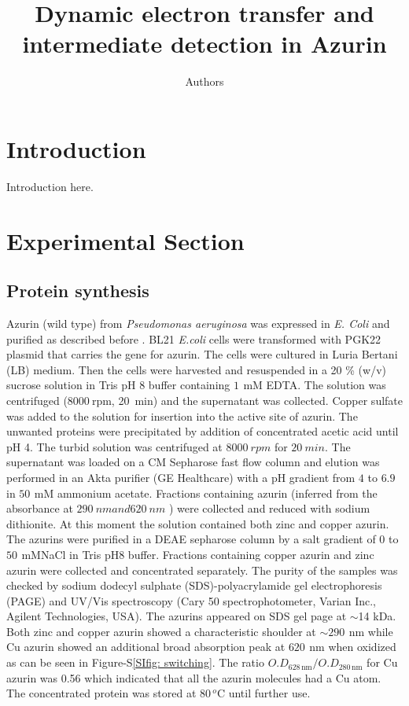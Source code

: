 \documentclass[journal=jacsat,manuscript=article]{achemso}
\author{Authors}
\affiliation{Huygens-Kamerlingh Onnes Laboratory, Leiden University, RA, Leiden, The Netherlands}
\title[]
{Dynamic electron transfer and intermediate detection in Azurin}
\newcommand{\nm}{\ensuremath{\,\textrm{nm}}}
\newcommand{\mM}{\ensuremath{\,\textrm{mM}}}
\newcommand{\degree}{\ensuremath{\,^o\textrm{C}}}
\begin{document}
\section{Introduction}
Introduction here.
\section{Experimental Section}
\subsection{Protein synthesis}
Azurin (wild type) from \textit{Pseudomonas aeruginosa} was expressed in \textit{E. Coli} and purified as described before \citep{kamp1990purification}. BL21 \textit{E.coli} cells were transformed with PGK22 plasmid that carries the gene for azurin. The cells were cultured in Luria Bertani (LB) medium. Then the cells were harvested and resuspended in a 20 \% (w/v) sucrose solution in Tris pH 8 buffer containing $1~\mM$ EDTA. The solution was centrifuged ($8000~$rpm, 20~min) and the supernatant was collected. Copper sulfate was added to the solution for insertion into the active site of azurin. The unwanted proteins were precipitated by addition of concentrated acetic acid until pH 4. The turbid solution was centrifuged at $8000~rpm$ for $20~min$. The supernatant was loaded on a CM Sepharose fast flow column and elution was performed in an Akta purifier (GE Healthcare) with a pH gradient from $4$ to $6.9$ in $50~\mM$ ammonium acetate. Fractions containing azurin (inferred from the absorbance at $290~nm and 620~nm$ ) were collected and reduced with sodium dithionite. At this moment the solution contained both zinc and copper azurin. The azurins were purified in a DEAE sepharose column by a salt gradient of 0 to $50~$\mM NaCl in Tris pH8 buffer. Fractions containing copper azurin and zinc azurin were collected and concentrated separately. The purity of the samples was checked by sodium dodecyl sulphate (SDS)-polyacrylamide gel electrophoresis (PAGE) and UV/Vis spectroscopy (Cary 50 spectrophotometer, Varian Inc., Agilent Technologies, USA). The azurins appeared on SDS gel page at $\sim$14 kDa. Both zinc and copper azurin showed a characteristic shoulder at ${\sim}290~\nm$ while Cu azurin showed an additional broad absorption peak at $620~\nm$ when oxidized as can be seen in Figure-S\ref{SIfig: switching}. The ratio $O.D_{628\nm}/O.D_{280\nm}$ for Cu azurin was 0.56 which indicated that all the azurin molecules had a Cu atom. The concentrated protein was stored at $80\degree$ until further use.
\end{document}
